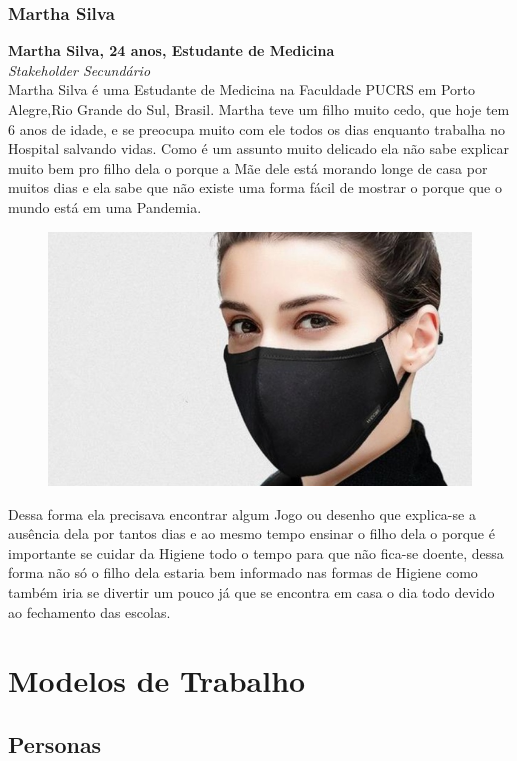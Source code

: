 \documentclass[12pt,brazil,a4paper]{article}
\begin{document}
\subsubsection{Martha Silva}
\textbf{Martha Silva, 24 anos, Estudante de Medicina}\\
\textit{Stakeholder Secundário}\\
Martha Silva é uma Estudante de Medicina na Faculdade PUCRS em Porto Alegre,Rio Grande do Sul, Brasil.
Martha teve um filho muito cedo, que hoje tem 6 anos de idade, e se preocupa muito com ele todos os dias enquanto trabalha
no Hospital salvando vidas. Como é um assunto muito delicado ela não sabe explicar muito bem pro filho dela o porque
a Mãe dele está morando longe de casa por muitos dias e ela sabe que não existe uma forma fácil de mostrar o porque
que o mundo está em uma Pandemia. 
\begin{figure}
\includegraphics[width=1.0\linewidth]{adult_1.jpg}
\end{figure}
Dessa forma ela precisava encontrar algum Jogo ou desenho que explica-se a ausência dela
por tantos dias e ao mesmo tempo ensinar o filho dela o porque é importante se cuidar da Higiene todo 
o tempo para que não fica-se doente, dessa forma não só o filho dela estaria bem informado nas formas de Higiene
como também iria se divertir um pouco já que se encontra em casa o dia todo devido ao fechamento das escolas.
\section{Modelos de Trabalho}
\begin{description}
\subsection{Personas}

\end{description}
\end{document}
